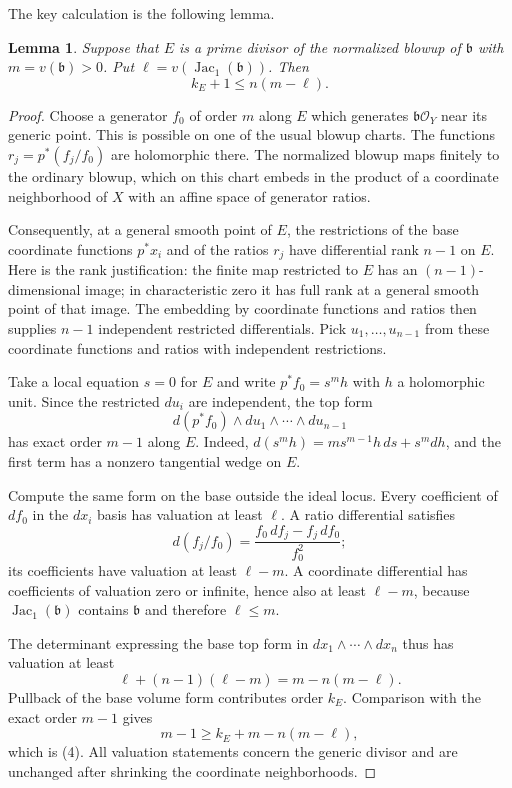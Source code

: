 \documentclass[11pt]{article}
\newcommand{\Jac}{\operatorname{Jac}}
\newtheorem{lemma}{Lemma}
\begin{document}
The key calculation is the following lemma.

\begin{lemma}
Suppose that $E$ is a prime divisor of the normalized blowup of
$\mathfrak b$ with $m=v(\mathfrak b)>0$. Put
$\ell=v(\Jac_1(\mathfrak b))$. Then
\[
 k_E+1\leq n(m-\ell).
 \tag{4}
\]
\end{lemma}

\begin{proof}
Choose a generator $f_0$ of order $m$ along $E$ which generates
$\mathfrak b\mathcal O_Y$ near its generic point. This is possible
on one of the usual blowup charts. The functions
$r_j=p^*(f_j/f_0)$ are holomorphic there.
The normalized blowup maps finitely to the ordinary blowup,
which on this chart embeds in the product of a coordinate
neighborhood of $X$ with an affine space of generator ratios.

Consequently, at a general smooth point of $E$, the restrictions
of the base coordinate functions $p^*x_i$ and of the ratios
$r_j$ have differential rank $n-1$ on $E$.
Here is the rank justification: the finite map restricted to
$E$ has an $(n-1)$-dimensional image; in characteristic zero
it has full rank at a general smooth point of that image.
The embedding by coordinate functions and ratios then supplies
$n-1$ independent restricted differentials. Pick $u_1,\ldots,
u_{n-1}$ from these coordinate functions and ratios with
independent restrictions.

Take a local equation $s=0$ for $E$ and write
$p^*f_0=s^m h$ with $h$ a holomorphic unit. Since the restricted
$du_i$ are independent, the top form
\[
 d(p^*f_0)\wedge du_1\wedge\cdots\wedge du_{n-1}
\]
has exact order $m-1$ along $E$. Indeed,
$d(s^mh)=m s^{m-1}h\,ds+s^m dh$, and the first term has a
nonzero tangential wedge on $E$.

Compute the same form on the base outside the ideal locus.
Every coefficient of $df_0$ in the $dx_i$ basis has valuation
at least $\ell$. A ratio differential satisfies
\[
 d(f_j/f_0)=\frac{f_0\,df_j-f_j\,df_0}{f_0^2};
 \tag{5}
\]
its coefficients have valuation at least $\ell-m$.
A coordinate differential has coefficients of valuation
zero or infinite, hence also at least $\ell-m$, because
$\Jac_1(\mathfrak b)$ contains $\mathfrak b$ and
therefore $\ell\leq m$.

The determinant expressing the base top form in
$dx_1\wedge\cdots\wedge dx_n$ thus has valuation at least
\[
 \ell+(n-1)(\ell-m)=m-n(m-\ell).
 \tag{6}
\]
Pullback of the base volume form contributes order $k_E$.
Comparison with the exact order $m-1$ gives
\[
 m-1\geq k_E+m-n(m-\ell),
\]
which is (4).
All valuation statements concern the generic divisor and are
unchanged after shrinking the coordinate neighborhoods.
\end{proof}
\end{document}
